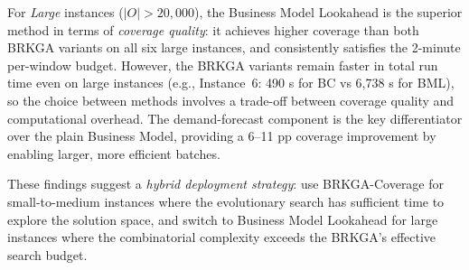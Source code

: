 For \emph{Large} instances ($|O| > 20{,}000$), the Business Model
Lookahead is the superior method in terms of \emph{coverage quality}:
it achieves higher coverage than both BRKGA variants on all six
large instances, and consistently satisfies the 2-minute per-window
budget.
However, the BRKGA variants remain faster in total run time even
on large instances (e.g., Instance~6: 490 s for BC vs 6{,}738 s for BML),
so the choice between methods involves a trade-off between
coverage quality and computational overhead.
The demand-forecast component is the key differentiator over the
plain Business Model, providing a 6--11 pp coverage improvement
by enabling larger, more efficient batches.

These findings suggest a \emph{hybrid deployment strategy}:
use BRKGA-Coverage for small-to-medium instances where the
evolutionary search has sufficient time to explore the solution
space, and switch to Business Model Lookahead for large instances
where the combinatorial complexity exceeds the BRKGA's effective
search budget.
